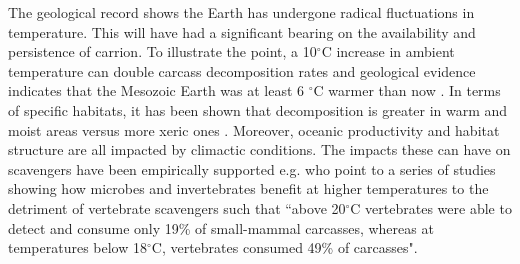 \documentclass[a4paper,12pt]{article}
\begin{document}
The geological record shows the Earth has undergone radical fluctuations in temperature.
This will have had a significant bearing on the availability and persistence of carrion.
To illustrate the point, a 10$^{\circ}$C increase in ambient temperature can double carcass decomposition rates \citep{parmenter2009carrion} and geological evidence indicates that the Mesozoic Earth was at least 6 $^{\circ}$C warmer than now \citep{sellwood2006mesozoic}.
In terms of specific habitats, it has been shown that decomposition is greater in warm and moist areas versus more xeric ones \citep{beasley2015vertebrates}.
Moreover, oceanic productivity and habitat structure are all impacted by climactic conditions.
The impacts these can have on scavengers have been empirically supported e.g.
\cite{beasley2015vertebrates} who point to a series of studies showing how microbes and invertebrates benefit at higher temperatures to the detriment of vertebrate scavengers such that ``above 20$^{\circ}$C vertebrates were able to detect and consume only 19\% of small-mammal carcasses, whereas at temperatures below 18$^{\circ}$C, vertebrates consumed 49\% of carcasses".





 
\end{document}
